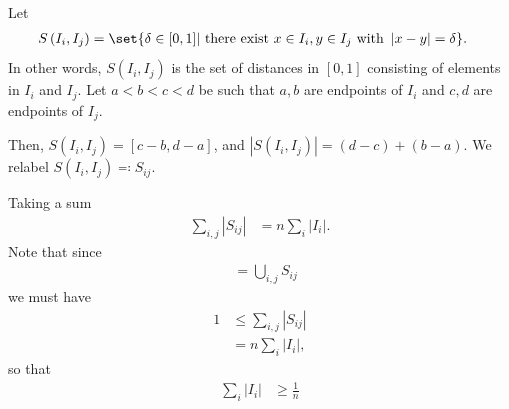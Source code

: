 \documentclass[10pt]{mypackage}
\begin{document}
\begin{solution}
  Let
  \begin{align*}
    S\left( I_i,I_j \right) &= \set{\delta\in [0,1] | \text{ there exist }x\in I_i,y\in I_j\text{ with }\left\vert x-y \right\vert = \delta}.
  \end{align*}
  In other words, $S\left( I_i,I_j \right)$ is the set of distances in $[0,1]$ consisting of elements in $I_i$ and $I_j$. Let $a < b < c < d$ be such that $a,b$ are endpoints of $I_i$ and $c,d$ are endpoints of $I_j$.\newline

  Then, $S\left( I_i,I_j \right) = \left[ c-b,d-a \right]$, and $\left\vert S\left( I_i,I_j \right) \right\vert = \left( d-c \right) + \left( b-a \right)$. We relabel $S\left( I_i,I_j \right) \eqcolon S_{ij}$.\newline

  Taking a sum
  \begin{align*}
    \sum_{i, j}\left\vert S_{ij} \right\vert &= n\sum_{i}\left\vert I_i \right\vert.
  \end{align*}
  Note that since
  \begin{align*}
    [0,1] &= \bigcup_{i,j}S_{ij}
  \end{align*}
  we must have
  \begin{align*}
    1 &\leq \sum_{i,j}\left\vert S_{ij} \right\vert\\
      &= n\sum_{i}\left\vert I_i \right\vert,
  \end{align*}
  so that
  \begin{align*}
    \sum_{i} \left\vert I_i \right\vert &\geq \frac{1}{n}
  \end{align*}
\end{solution}
\end{document}
